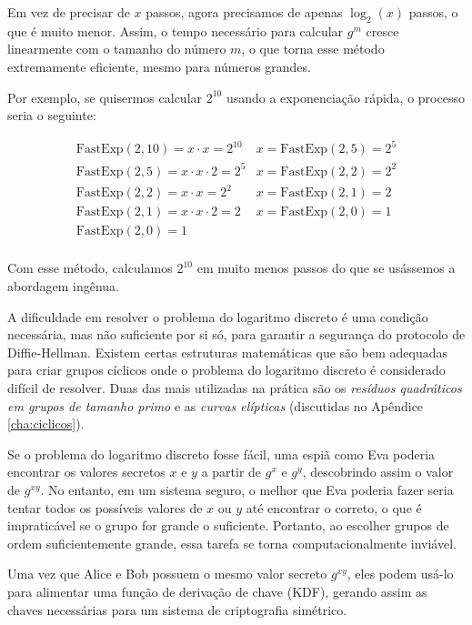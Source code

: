 Em vez de precisar de $x$ passos, agora precisamos de apenas $\log_2(x)$ passos, o que é muito menor.
Assim, o tempo necessário para calcular $g^m$ cresce linearmente com o tamanho do número $m$, o que torna esse método extremamente eficiente, mesmo para números grandes.

Por exemplo, se quisermos calcular $2^{10}$ usando a exponenciação rápida, o processo seria o seguinte:

\begin{displaymath}
  \begin{array}{ll}
    \text{FastExp}(2, 10) = x \cdot x = 2^{10} & x = \text{FastExp}(2, 5) = 2^5 \\
    \text{FastExp}(2, 5)  = x \cdot x \cdot 2 = 2^5 & x = \text{FastExp}(2, 2) = 2^2\\
    \text{FastExp}(2, 2)  = x \cdot x = 2^2 & x = \text{FastExp}(2, 1) = 2\\
    \text{FastExp}(2, 1)  = x \cdot x \cdot 2 = 2 & x = \text{FastExp}(2, 0) = 1\\
    \text{FastExp}(2, 0)  = 1 \\
  \end{array}
\end{displaymath}

Com esse método, calculamos $2^{10}$ em muito menos passos do que se usássemos a abordagem ingênua.

A dificuldade em resolver o problema do logaritmo discreto é uma condição necessária, mas não suficiente por si só, para garantir a segurança do protocolo de Diffie-Hellman.
Existem certas estruturas matemáticas que são bem adequadas para criar grupos cíclicos onde o problema do logaritmo discreto é considerado difícil de resolver.
Duas das mais utilizadas na prática são os {\em resíduos quadráticos em grupos de tamanho primo} e as {\em curvas elípticas} (discutidas no Apêndice \ref{cha:ciclicos}).

Se o problema do logaritmo discreto fosse fácil, uma espiã como Eva poderia encontrar os valores secretos $x$ e $y$ a partir de $g^x$ e $g^y$, descobrindo assim o valor de $g^{xy}$.
No entanto, em um sistema seguro, o melhor que Eva poderia fazer seria tentar todos os possíveis valores de $x$ ou $y$ até encontrar o correto, o que é impraticável se o grupo for grande o suficiente.
Portanto, ao escolher grupos de ordem suficientemente grande, essa tarefa se torna computacionalmente inviável.

Uma vez que Alice e Bob possuem o mesmo valor secreto $g^{xy}$, eles podem usá-lo para alimentar uma função de derivação de chave (KDF), gerando assim as chaves necessárias para um sistema de criptografia simétrico.

